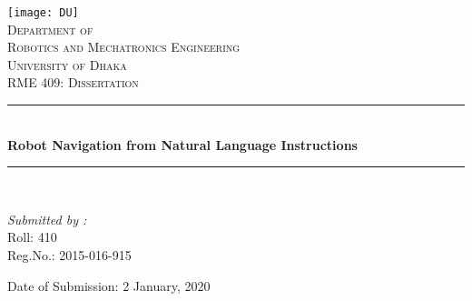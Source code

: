 \begin{titlepage}
		\newcommand{\HRule}{\rule{\linewidth}{0.1mm}}
		\centering %
		
		\centering
		\texttt{[image: DU]}\\
		\textsc{\Large Department of\\ Robotics and Mechatronics Engineering}\\[0.5cm]
		\textsc{\LARGE University of Dhaka}\\[1.cm]
		
		\textsc{\Large RME 409: Dissertation}\\[0.5cm] %
		
		\HRule \\[.5cm]
		{ \LARGE \bfseries Robot Navigation from Natural Language Instructions}\\[0.1cm] %
		\HRule \\[1.5cm]
		
		
		\begin{minipage}{0.4\textwidth}
            \begin{flushleft} \large
                
                \emph{Submitted by :}\\
                Roll: 410\\
                Reg.No.: 2015-016-915\\[0.2cm]
                    
            \end{flushleft}
        \end{minipage}   
		\vfill
		{\large Date of Submission: 2 January, 2020}\\[1cm] %
		\vfill %
		
	\end{titlepage}
